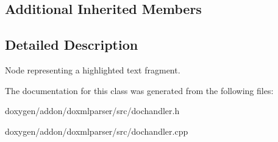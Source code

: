 \subsection*{Additional Inherited Members}


\subsection{Detailed Description}
Node representing a highlighted text fragment. 



The documentation for this class was generated from the following files\+:\begin{DoxyCompactItemize}
\item 
doxygen/addon/doxmlparser/src/dochandler.\+h\item 
doxygen/addon/doxmlparser/src/dochandler.\+cpp\end{DoxyCompactItemize}
